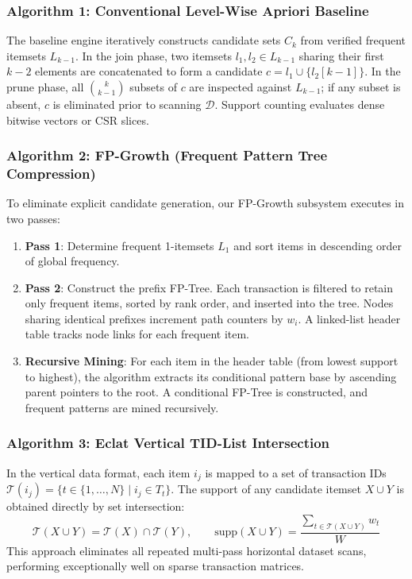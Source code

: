 \documentclass[11pt,a4paper]{article}
\begin{document}
\subsubsection{Algorithm 1: Conventional Level-Wise Apriori Baseline}
The baseline engine iteratively constructs candidate sets $C_k$ from verified frequent itemsets $L_{k-1}$. In the join phase, two itemsets $l_1, l_2 \in L_{k-1}$ sharing their first $k-2$ elements are concatenated to form a candidate $c = l_1 \cup \{l_2[k-1]\}$. In the prune phase, all $\binom{k}{k-1}$ subsets of $c$ are inspected against $L_{k-1}$; if any subset is absent, $c$ is eliminated prior to scanning $\mathcal{D}$. Support counting evaluates dense bitwise vectors or CSR slices.

\subsubsection{Algorithm 2: FP-Growth (Frequent Pattern Tree Compression)}
To eliminate explicit candidate generation, our FP-Growth subsystem executes in two passes:
\begin{enumerate}
    \item \textbf{Pass 1}: Determine frequent 1-itemsets $L_1$ and sort items in descending order of global frequency.
    \item \textbf{Pass 2}: Construct the prefix FP-Tree. Each transaction is filtered to retain only frequent items, sorted by rank order, and inserted into the tree. Nodes sharing identical prefixes increment path counters by $w_i$. A linked-list header table tracks node links for each frequent item.
    \item \textbf{Recursive Mining}: For each item in the header table (from lowest support to highest), the algorithm extracts its conditional pattern base by ascending parent pointers to the root. A conditional FP-Tree is constructed, and frequent patterns are mined recursively.
\end{enumerate}

\subsubsection{Algorithm 3: Eclat Vertical TID-List Intersection}
In the vertical data format, each item $i_j$ is mapped to a set of transaction IDs $\mathcal{T}(i_j) = \{t \in \{1,\dots,N\} \mid i_j \in T_t\}$. The support of any candidate itemset $X \cup Y$ is obtained directly by set intersection:
\begin{equation}
\mathcal{T}(X \cup Y) = \mathcal{T}(X) \cap \mathcal{T}(Y), \qquad \text{supp}(X \cup Y) = \frac{\sum_{t \in \mathcal{T}(X \cup Y)} w_t}{W}
\end{equation}
This approach eliminates all repeated multi-pass horizontal dataset scans, performing exceptionally well on sparse transaction matrices.
\end{document}
